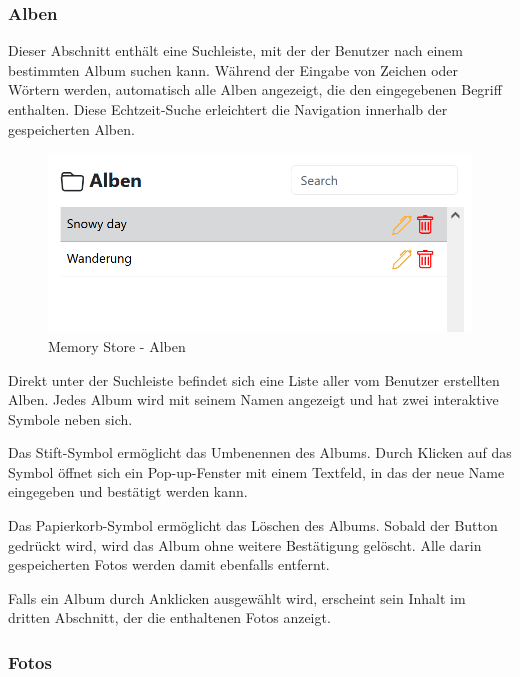 \subsubsection{Alben}

Dieser Abschnitt enthält eine Suchleiste, mit der der Benutzer nach einem bestimmten 
Album suchen kann. Während der Eingabe von Zeichen oder Wörtern werden, automatisch 
alle Alben angezeigt, die den eingegebenen Begriff enthalten. Diese Echtzeit-Suche 
erleichtert die Navigation innerhalb der gespeicherten Alben.

\begin{figure}
    \centering
    \includegraphics[scale=0.5]{pics/memory_store_teil2.PNG}
    \caption{Memory Store - Alben}
    \label{fig:memory-store-alben}
\end{figure}

Direkt unter der Suchleiste befindet sich eine Liste aller vom Benutzer erstellten 
Alben. Jedes Album wird mit seinem Namen angezeigt und hat zwei interaktive Symbole 
neben sich.

Das Stift-Symbol ermöglicht das Umbenennen des Albums. Durch Klicken auf das Symbol 
öffnet sich ein Pop-up-Fenster mit einem Textfeld, in das der neue Name eingegeben 
und bestätigt werden kann.

Das Papierkorb-Symbol ermöglicht das Löschen des Albums. Sobald der Button gedrückt 
wird, wird das Album ohne weitere Bestätigung gelöscht. Alle darin gespeicherten 
Fotos werden damit ebenfalls entfernt.

Falls ein Album durch Anklicken ausgewählt wird, erscheint sein Inhalt im dritten 
Abschnitt, der die enthaltenen Fotos anzeigt.

\subsubsection{Fotos}


